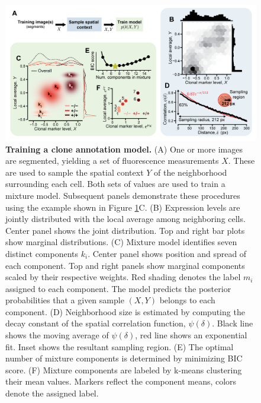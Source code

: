 \begin{figure}[h]
\includegraphics[scale=1.0]{./figure_S3}
\caption[Training a clone annotation model.]{\textbf{Training a clone annotation model.} (A) One or more images are segmented, yielding a set of fluorescence measurements $X$. These are used to sample the spatial context $Y$ of the neighborhood surrounding each cell. Both sets of values are used to train a mixture model. Subsequent panels demonstrate these procedures using the example shown in Figure \ref{fig:figS3}C. (B) Expression levels are jointly distributed with the local average among neighboring cells. Center panel shows the joint distribution. Top and right bar plots show marginal distributions. (C) Mixture model identifies seven distinct components $k_i$. Center panel shows position and spread of each component. Top and right panels show marginal components scaled by their respective weights. Red shading denotes the label $m_i$ assigned to each component. The model predicts the posterior probabilities that a given sample $(X,Y)$ belongs to each component. (D) Neighborhood size is estimated by computing the decay constant of the spatial correlation function, $\psi(\delta)$. Black line shows the moving average of $\psi(\delta)$, red line shows an exponential fit. Inset shows the resultant sampling region. (E) The optimal number of mixture components is determined by minimizing BIC score. (F) Mixture components are labeled by k-means clustering their mean values. Markers reflect the component means, colors denote the assigned label.}
\label{fig:figS3}
\end{figure}

